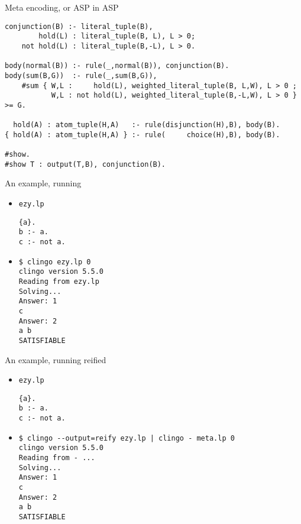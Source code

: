 \begin{frame}[fragile,shrink=34]{Meta encoding, or ASP in ASP}
\bigskip
\begin{lstlisting}
conjunction(B) :- literal_tuple(B),
        hold(L) : literal_tuple(B, L), L > 0;
    not hold(L) : literal_tuple(B,-L), L > 0.

body(normal(B)) :- rule(_,normal(B)), conjunction(B).
body(sum(B,G))  :- rule(_,sum(B,G)),
    #sum { W,L :     hold(L), weighted_literal_tuple(B, L,W), L > 0 ;
           W,L : not hold(L), weighted_literal_tuple(B,-L,W), L > 0 } >= G.

  hold(A) : atom_tuple(H,A)   :- rule(disjunction(H),B), body(B).
{ hold(A) : atom_tuple(H,A) } :- rule(     choice(H),B), body(B).

#show.
#show T : output(T,B), conjunction(B).
\end{lstlisting}
\end{frame}
\begin{frame}[fragile]{An example, running}
  \begin{itemize}
  \item {} \texttt{ezy.lp}
\begin{lstlisting}
{a}.
b :- a.
c :- not a.
\end{lstlisting}
  \item<2-> 
\begin{lstlisting}[basicstyle=\small\ttfamily]
$ clingo ezy.lp 0
clingo version 5.5.0
Reading from ezy.lp
Solving...
Answer: 1
c
Answer: 2
a b
SATISFIABLE
\end{lstlisting}
  \end{itemize}
\end{frame}
\begin{frame}[fragile]{An example, running reified}
  \begin{itemize}
  \item {} \texttt{ezy.lp}
\begin{lstlisting}
{a}.
b :- a.
c :- not a.
\end{lstlisting}
  \item<2-> 
\begin{lstlisting}[basicstyle=\small\ttfamily]
$ clingo --output=reify ezy.lp | clingo - meta.lp 0
clingo version 5.5.0
Reading from - ...
Solving...
Answer: 1
c
Answer: 2
a b
SATISFIABLE
\end{lstlisting}
  \end{itemize}
\end{frame}
%
